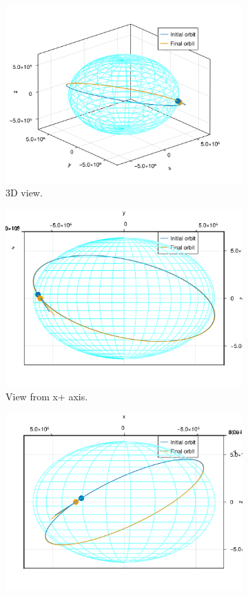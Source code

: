 \begin{figure}[htbp]
    \centering
    \begin{subfigure}{0.49\linewidth}
        \includegraphics[width=0.8\linewidth]{../results/two_body/ipv_noncop/scenario_3d.png}
        \caption{3D view.}
    \end{subfigure}
    \begin{subfigure}{0.49\linewidth}
        \includegraphics[width=0.8\linewidth]{../results/two_body/ipv_noncop/scenario_x+.png}
        \caption{View from x+ axis.}
    \end{subfigure}
    \begin{subfigure}{0.49\linewidth}
        \includegraphics[width=0.8\linewidth]{../results/two_body/ipv_noncop/scenario_y+.png}

\end{subfigure}
\end{figure}

